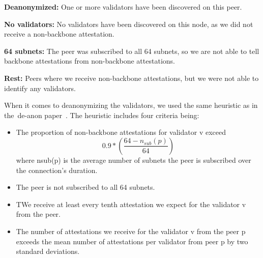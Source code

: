 \textbf{Deanonymized:} One or more validators have been discovered on this peer.

\textbf{No validators:} No validators have been discovered on this node, as we did not receive a non-backbone attestation.

\textbf{64 subnets:} The peer was subscribed to all 64 subnets,
so we are not able to tell backbone attestations from non-backbone attestations.

\textbf{Rest:} Peers where we receive non-backbone attestations, but we were not able to identify any validators.

When it comes to deanonymizing the validators,
we used the same heuristic as in the~\gls{de-anon paper}~\cite{heimbach2024deanonymizingethereumvalidatorsp2p}.
The heuristic includes four criteria being:
\begin{itemize}
    \item The proportion of non-backbone attestations for validator v exceed
    \begin{equation}
        0.9*\left(\frac{64-n_{sub}(p)}{64}\right)
        \label{eq:heurestic}
    \end{equation} where nsub(p) is the average number of subnets the peer is subscribed over the connection’s duration.
    \item The peer is not subscribed to all 64 subnets.
    \item TWe receive at least every tenth attestation we expect for the validator v from the peer.
    \item The number of attestations we receive for the validator v from the peer p exceeds the mean number of attestations per validator from peer p by two standard deviations.
\end{itemize}
